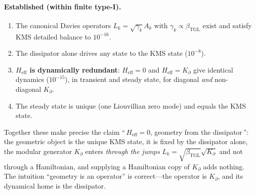 \documentclass[11pt,a4paper]{article}
\theoremstyle{plain}
\theoremstyle{definition}
\newcommand{\Kp}{K_{\partial}}
\newcommand{\beTGL}{\beta_{\mathrm{TGL}}}
\newcommand{\Heff}{H_{\mathrm{eff}}}
\begin{document}
\paragraph{Established (within finite type-I).}
\begin{enumerate}[leftmargin=1.6em]
\item The canonical Davies operators $L_k=\sqrt{\gamma_k}A_k$ with
  $\gamma_k\propto\beTGL$ exist and satisfy KMS detailed balance to $10^{-16}$.
\item The dissipator alone drives any state to the KMS state ($10^{-8}$).
\item \textbf{$\Heff$ is dynamically redundant}: $\Heff=0$ and $\Heff=\Kp$ give
  identical dynamics ($10^{-15}$), in transient and steady state, for diagonal
  \emph{and} non-diagonal $\Kp$.
\item The steady state is unique (one Liouvillian zero mode) and equals the KMS
  state.
\end{enumerate}
Together these make precise the claim ``\,$\Heff=0$, geometry from the
dissipator\,'': the geometric object is the unique KMS state, it is fixed by the
dissipator alone, the modular generator $\Kp$ enters \emph{through the jumps}
$L_k=\sqrt{\beTGL}\sqrt{\Kp}$ and not through a Hamiltonian, and supplying a
Hamiltonian copy of $\Kp$ adds nothing. The intuition ``geometry is an operator''
is correct---the operator is $\Kp$, and its dynamical home is the dissipator.
\end{document}
